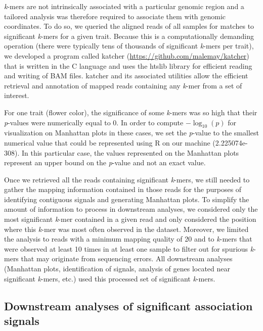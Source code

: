 \emph{k}-mers are not intrinsically associated with a particular genomic region
and a tailored analysis was therefore required to associate them with genomic
coordinates. To do so, we queried the aligned reads of all samples for matches
to significant \emph{k}-mers for a given trait. Because this is a
computationally demanding operation (there were typically tens of thousands of
significant \emph{k}-mers per trait), we developed a program called katcher
(\url{https://github.com/malemay/katcher}) that is written in the C language
and uses the htslib library \citep{bonfield2021} for efficient reading and
writing of BAM files. katcher and its associated utilities allow the efficient
retrieval and annotation of mapped reads containing any \emph{k}-mer from a set
of interest.

For one trait (flower color), the significance of some \emph{k}-mers was so
high that their \emph{p}-values were numerically equal to 0. In order to
compute $-\log_{10} (p)$ for visualization on Manhattan plots in these cases,
we set the \emph{p}-value to the smallest numerical value that could be
represented using R on our machine (2.225074e-308). In this particular case,
the values represented on the Manhattan plots represent an upper bound on the
\emph{p}-value and not an exact value.

Once we retrieved all the reads containing significant \emph{k}-mers, we still
needed to gather the mapping information contained in those reads for the
purposes of identifying contiguous signals and generating Manhattan plots. To
simplify the amount of information to process in downstream analyses, we
considered only the most significant \emph{k}-mer contained in a given read and
only considered the position where this \emph{k}-mer was most often observed in
the dataset. Moreover, we limited the analysis to reads with a minimum mapping
quality of 20 and to \emph{k}-mers that were observed at least 10 times in at
least one sample to filter out for spurious \emph{k}-mers that may originate
from sequencing errors. All downstream analyses (Manhattan plots,
identification of signals, analysis of genes located near significant
\emph{k}-mers, etc.) used this processed set of significant \emph{k}-mers.

\subsection*{Downstream analyses of significant association signals}
\label{sv-gwas-methods-downstream}


